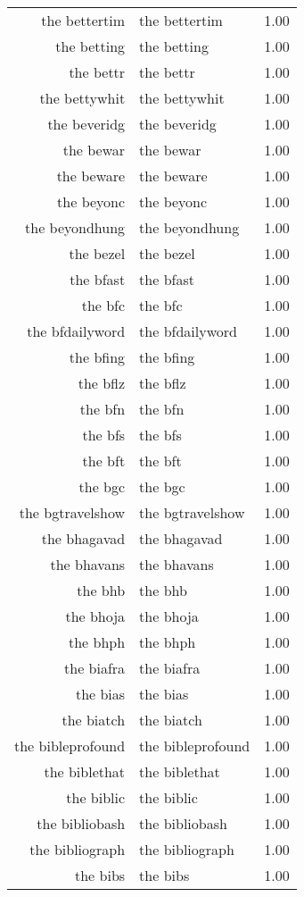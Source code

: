 \begin{table}[ht]
\begin{tabular}{rlr}
  the bettertim & the bettertim & 1.00 \\ 
  the betting & the betting & 1.00 \\ 
  the bettr & the bettr & 1.00 \\ 
  the bettywhit & the bettywhit & 1.00 \\ 
  the beveridg & the beveridg & 1.00 \\ 
  the bewar & the bewar & 1.00 \\ 
  the beware & the beware & 1.00 \\ 
  the beyonc & the beyonc & 1.00 \\ 
  the beyondhung & the beyondhung & 1.00 \\ 
  the bezel & the bezel & 1.00 \\ 
  the bfast & the bfast & 1.00 \\ 
  the bfc & the bfc & 1.00 \\ 
  the bfdailyword & the bfdailyword & 1.00 \\ 
  the bfing & the bfing & 1.00 \\ 
  the bflz & the bflz & 1.00 \\ 
  the bfn & the bfn & 1.00 \\ 
  the bfs & the bfs & 1.00 \\ 
  the bft & the bft & 1.00 \\ 
  the bgc & the bgc & 1.00 \\ 
  the bgtravelshow & the bgtravelshow & 1.00 \\ 
  the bhagavad & the bhagavad & 1.00 \\ 
  the bhavans & the bhavans & 1.00 \\ 
  the bhb & the bhb & 1.00 \\ 
  the bhoja & the bhoja & 1.00 \\ 
  the bhph & the bhph & 1.00 \\ 
  the biafra & the biafra & 1.00 \\ 
  the bias & the bias & 1.00 \\ 
  the biatch & the biatch & 1.00 \\ 
  the bibleprofound & the bibleprofound & 1.00 \\ 
  the biblethat & the biblethat & 1.00 \\ 
  the biblic & the biblic & 1.00 \\ 
  the bibliobash & the bibliobash & 1.00 \\ 
  the bibliograph & the bibliograph & 1.00 \\ 
  the bibs & the bibs & 1.00 \\ 

\end{tabular}
\end{table}
